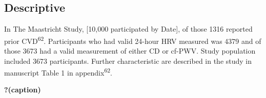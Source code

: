 \documentclass[
  a4paper,
  headsepline=true,
  open=any]{scrbook}
\begin{document}
\hypertarget{descriptive}{%
\subsection{Descriptive}\label{descriptive}}

In The Maastricht Study, {[}10,000 participated by Date{]}, of those
1316 reported prior CVD\textsuperscript{62}. Participants who had valid
24-hour HRV measured was 4379 and of those 3673 had a valid measurement
of either CD or cf-PWV. Study population included 3673 participants.
Further characteristic are described in the study in manuscript Table 1
in appendix\textsuperscript{62}.

\begin{table}

\caption{\label{tbl-ms}\textbf{?(caption)}}\begin{minipage}[t]{\linewidth}
\subcaption{\label{tbl-ms-1}}

{\centering 

}
\end{minipage}
\end{table}
\end{document}
